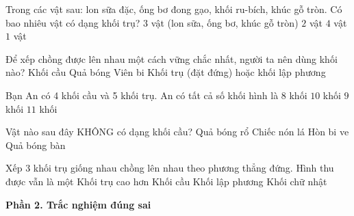\begin{ex} %
Trong các vật sau: lon sữa đặc, ống bơ đong gạo, khối ru-bích, khúc gỗ tròn. Có bao nhiêu vật có dạng khối trụ?
\choice
{\True $3$ vật (lon sữa, ống bơ, khúc gỗ tròn)}
{$2$ vật}
{$4$ vật}
{$1$ vật}
\end{ex}

\begin{ex} %
Để xếp chồng được lên nhau một cách vững chắc nhất, người ta nên dùng khối nào?
\choice
{Khối cầu}
{Quả bóng}
{Viên bi}
{\True Khối trụ (đặt đứng) hoặc khối lập phương}
\end{ex}

\begin{ex} %
Bạn An có 4 khối cầu và 5 khối trụ. An có tất cả số khối hình là
\choice
{$8$ khối}
{$10$ khối}
{\True $9$ khối}
{$11$ khối}
\end{ex}

\begin{ex} %
Vật nào sau đây KHÔNG có dạng khối cầu?
\choice
{Quả bóng rổ}
{\True Chiếc nón lá}
{Hòn bi ve}
{Quả bóng bàn}
\end{ex}

\begin{ex} %
Xếp 3 khối trụ giống nhau chồng lên nhau theo phương thẳng đứng. Hình thu được vẫn là một
\choice
{\True Khối trụ cao hơn}
{Khối cầu}
{Khối lập phương}
{Khối chữ nhật}
\end{ex}

\textbf{Phần 2. Trắc nghiệm đúng sai}

